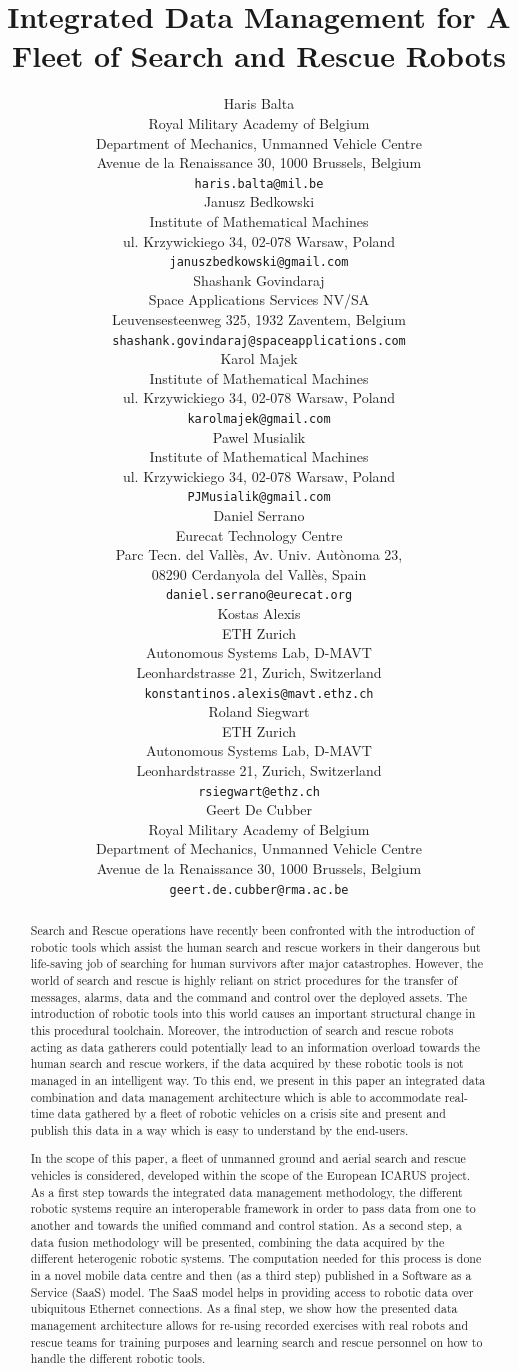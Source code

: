 \documentclass{article}
\title{Integrated Data Management for A Fleet of Search and Rescue Robots}
\author{
Haris Balta \\
Royal Military Academy of Belgium\\
Department of Mechanics, Unmanned Vehicle Centre\\
Avenue de la Renaissance 30, 1000 Brussels, Belgium\\
\texttt{haris.balta@mil.be} \\
\And
Janusz Bedkowski \\
Institute of Mathematical Machines\\
ul. Krzywickiego 34, 02-078 Warsaw, Poland\\
\texttt{januszbedkowski@gmail.com} \\
\And
Shashank Govindaraj\\
Space Applications Services NV/SA \\
Leuvensesteenweg 325, 1932 Zaventem, Belgium \\
\texttt{shashank.govindaraj@spaceapplications.com} \\
\And
Karol Majek \\
Institute of Mathematical Machines\\
ul. Krzywickiego 34, 02-078 Warsaw, Poland\\
\texttt{karolmajek@gmail.com} \\
\And
Pawel Musialik \\
Institute of Mathematical Machines\\
ul. Krzywickiego 34, 02-078 Warsaw, Poland\\
\texttt{PJMusialik@gmail.com} \\
\And
Daniel Serrano\\
Eurecat Technology Centre\\
Parc Tecn. del Vall{\`e}s, Av. Univ. Aut{\`o}noma 23, \\
08290 Cerdanyola del Vall{\`e}s, Spain\\
\texttt{daniel.serrano@eurecat.org} \\
\And
Kostas Alexis\\
ETH Zurich\\
Autonomous Systems Lab, D-MAVT\\
Leonhardstrasse 21, Zurich, Switzerland\\
\texttt{konstantinos.alexis@mavt.ethz.ch} \\
\And
Roland Siegwart\\
ETH Zurich\\
Autonomous Systems Lab, D-MAVT\\
Leonhardstrasse 21, Zurich, Switzerland\\
\texttt{rsiegwart@ethz.ch} \\
\And
Geert De Cubber\\
Royal Military Academy of Belgium\\
Department of Mechanics, Unmanned Vehicle Centre\\
Avenue de la Renaissance 30, 1000 Brussels, Belgium\\
\texttt{geert.de.cubber@rma.ac.be} \\}
\begin{document}
\maketitle
\begin{abstract}
Search and Rescue operations have recently been confronted with the introduction of robotic tools which assist the human search and rescue workers in their dangerous but life-saving job of searching for human survivors after major catastrophes. However, the world of search and rescue is highly reliant on strict procedures for the transfer of messages, alarms, data and the command and control over the deployed assets. The introduction of robotic tools into this world causes an important structural change in this procedural toolchain. Moreover, the introduction of search and rescue robots acting as data gatherers could potentially lead to an information overload towards the human search and rescue workers, if the data acquired by these robotic tools is not managed in an intelligent way. To this end, we present in this paper an integrated data combination and data management architecture which is able to accommodate real-time data gathered by a fleet of robotic vehicles on a crisis site and present and publish this data in a way which is easy to understand by the end-users.

In the scope of this paper, a fleet of unmanned ground and aerial search and rescue vehicles is considered, developed within the scope of the European ICARUS project. As a first step towards the integrated data management methodology, the different robotic systems require an interoperable framework in order to pass data from one to another and towards the unified command and control station. As a second step, a data fusion methodology will be presented, combining the data acquired by the different heterogenic robotic systems. The computation needed for this process is done in a novel mobile data centre and then (as a third step) published in a Software as a Service (SaaS) model. The SaaS model helps in providing access to robotic data over ubiquitous Ethernet connections. As a final step, we show how the presented data management architecture allows for re-using recorded exercises with real robots and rescue teams for training purposes and learning search and rescue personnel on how to handle the different robotic tools.


\end{abstract}
\end{document}
